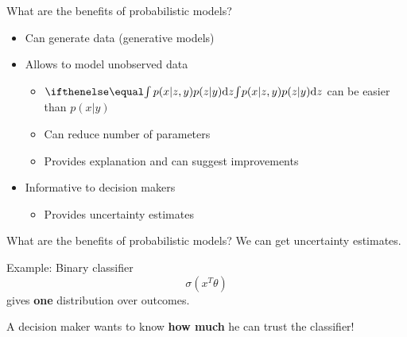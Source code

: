 \documentclass[14pt, aspectratio=169]{beamer}\usepackage[]{graphicx}\usepackage[]{color}
\begin{document}
\begin{frame}{What are the benefits of probabilistic models?}
\begin{itemize}
\item Can generate data (generative models)
\pause
\item Allows to model unobserved data
\begin{itemize}
\item $ \intl{p(x|z,y)p(z|y)}{z} $ can be easier than $ p(x|y) $
\item Can reduce number of parameters
\item Provides explanation and can suggest improvements
\end{itemize}
\pause
\item Informative to decision makers
\begin{itemize}
\item Provides uncertainty estimates
\end{itemize}
\end{itemize}


\end{frame}


\begin{frame}{What are the benefits of probabilistic models?}
We can get uncertainty estimates.
\begin{block}{Example: Binary classifier}
\begin{equation*}
\sigma\left(x^{T}\theta\right)
\end{equation*}
gives \textbf{one} distribution over outcomes.
\end{block}
A decision maker wants to know \textbf{how much} he can trust the classifier!
\end{frame}
\end{document}
